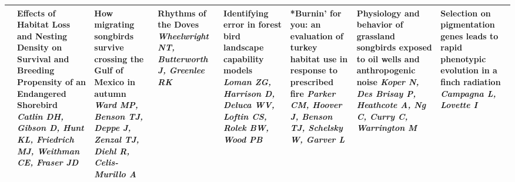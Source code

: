\begin{tabular}{|x{0.85cm}|x{2.85cm}|x{2.85cm}|x{2.85cm}|x{2.85cm}|x{2.85cm}|a{2.85cm}|a{2.85cm}|}
&Effects of Habitat Loss and Nesting Density on Survival and Breeding Propensity of an Endangered Shorebird \newline \newline \textit{Catlin DH, Gibson D, Hunt KL, Friedrich MJ, Weithman CE, Fraser JD} & How migrating songbirds survive crossing the Gulf of Mexico in autumn \newline \newline \textit{Ward MP, Benson TJ, Deppe J, Zenzal TJ, Diehl R, Celis-Murillo A} & Rhythms of the Doves \newline \newline \textit{Wheelwright NT, Butterworth J, Greenlee RK} & Identifying error in forest bird landscape capability models \newline \newline \textit{Loman ZG, Harrison D, Deluca WV, Loftin CS, Rolek BW, Wood PB} & *Burnin' for you: an evaluation of turkey habitat use in response to prescribed fire \newline \newline \textit{Parker CM, Hoover J, Benson TJ, Schelsky W, Garver L} & Physiology and behavior of grassland songbirds exposed to oil wells and anthropogenic noise \newline \newline \textit{Koper N, Des Brisay P, Heathcote A, Ng C, Curry C, Warrington M} & Selection on pigmentation genes leads to rapid phenotypic evolution in a finch radiation \newline \newline \textit{Campagna L, Lovette I}\\
\hline

\end{tabular}
